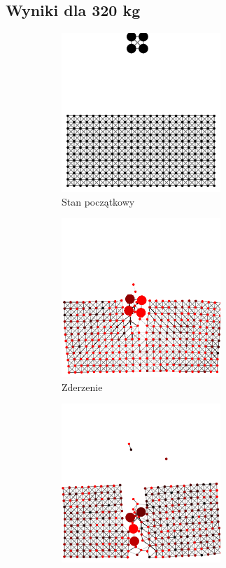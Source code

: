 \documentclass[12pt, letterpaper]{report}
\begin{document}
    \subsection{Wyniki dla 320 kg}
    \begin{figure}[h]

        \begin{subfigure}{0.5\textwidth}
            \centering
            \includegraphics[width=6cm, height=6cm]{collision_2x2_24x12_mass80_1} 
            \caption{Stan początkowy}
        \end{subfigure}
        \begin{subfigure}{0.5\textwidth}
            \centering
            \includegraphics[width=6cm, height=6cm]{collision_2x2_24x12_mass80_2}
            \caption{Zderzenie}
        \end{subfigure}
        \begin{subfigure}{0.5\textwidth}
            \centering
            \includegraphics[width=6cm, height=6cm]{collision_2x2_24x12_mass80_3}

\end{subfigure}
\end{figure}
\end{document}
